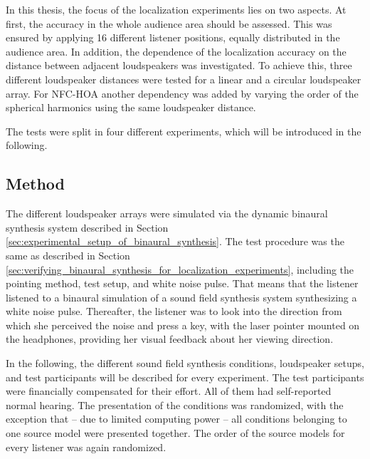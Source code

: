 In this thesis, the focus of the localization experiments lies on two aspects.
At first, the accuracy in the whole audience area should be assessed. This was ensured
by applying 16 different listener positions, equally distributed in the
audience area. In addition, the dependence of the localization accuracy on the
distance between adjacent loudspeakers was investigated. To achieve this,
three different loudspeaker distances were tested for a linear and a circular
loudspeaker array. For \ac{NFC-HOA} another dependency was added by varying the order
of the spherical harmonics using the same loudspeaker distance.

The tests were split in four different experiments, which will be introduced
in the following.


\subsection{Method}
\label{sec:localization_method}
%
The different loudspeaker arrays were simulated via the dynamic binaural synthesis
system described in Section\,\ref{sec:experimental_setup_of_binaural_synthesis}.
The test procedure was the same as described in
Section\,\ref{sec:verifying_binaural_synthesis_for_localization_experiments},
including the pointing method, test setup, and white noise pulse.
That means that the listener listened to a binaural simulation of a sound
field synthesis system synthesizing a white noise pulse. Thereafter, the
listener was to
look into the direction from which she perceived the noise and press a key,
with the
laser pointer mounted on the headphones, providing her visual feedback about
her viewing direction.

In the
following, the different sound field synthesis conditions, loudspeaker setups, and
test participants will be described for every experiment.
The test participants were financially compensated for their effort. All of them
had self-reported normal hearing.
The presentation of the conditions was randomized, with the exception that -- due to
limited computing power -- all conditions belonging to one source model were
presented together. The order of the source models for every listener was again
randomized.


